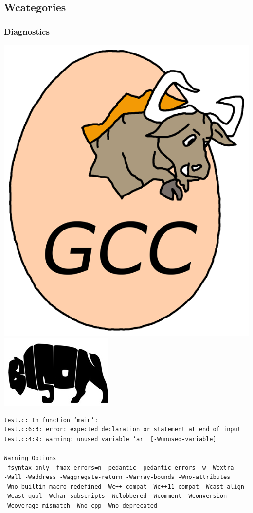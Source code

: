 \documentclass{beamer}
\begin{document}
\subsection{Wcategories}

\begin{frame}[fragile,shrink=25]
  \frametitle{Diagnostics}
  \begin{center}
    \includegraphics[scale=0.1]{gcc}
    \hfill
    \includegraphics[scale=0.5]{bison}
    \begin{verbatim}
test.c: In function ‘main’:
test.c:6:3: error: expected declaration or statement at end of input
test.c:4:9: warning: unused variable ‘ar’ [-Wunused-variable]

Warning Options
-fsyntax-only -fmax-errors=n -pedantic -pedantic-errors -w -Wextra
-Wall -Waddress -Waggregate-return -Warray-bounds -Wno-attributes
-Wno-builtin-macro-redefined -Wc++-compat -Wc++11-compat -Wcast-align
-Wcast-qual -Wchar-subscripts -Wclobbered -Wcomment -Wconversion
-Wcoverage-mismatch -Wno-cpp -Wno-deprecated
    \end{verbatim}
  \end{center}
\end{frame}
\end{document}
